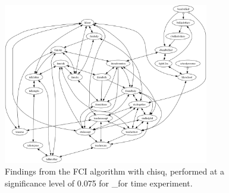 \begin{figure}[htbp]
    \centering
    \includegraphics[width=0.8\textwidth]{Report/final_report/pictures/FCI_chisq_0.075__for time experiment.png}
    \caption{Findings from the FCI algorithm with chisq, performed at a significance level of 0.075 for _for time experiment.}
    \label{fig:fci_chisq_0.075_for time experiment}
\end{figure}
